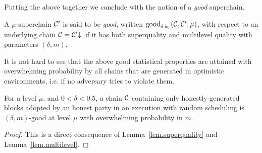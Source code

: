 
Putting the above together we conclude with the notion of a {\em good} superchain. 

\begin{definition}\label{lem.good}
A $\mu$-superchain $\mathcal{C}'$ is said to be \textit{good}, written
$\textnormal{good}_{\delta, k_1}(\mathcal{C}, \mathcal{C}', \mu)$, with respect to an
underlying chain $\mathcal{C} = \mathcal{C}'\negthickspace\downarrow\,$ if it has both superquality and multilevel quality with parameters $(\delta, m)$.
\end{definition}

It is not hard to see that the above good statistical properties are attained with overwhelming probability
by all chains that are generated in optimistic environments, i.e. if no
adversary tries to violate them.

\begin{lemma}
\label{lem.superchain-distribution}
For a level $\mu$, and $0 < \delta < 0.5$, a chain
$\mathcal{C}$ containing only honestly-generated blocks adopted by an honest party in
an execution with random scheduling is $(\delta, m)$-good at level
$\mu$ with overwhelming probability in $m$.
\end{lemma}
\ifonecolumn
\begin{proof}
This is a direct consequence of Lemma~\ref{lem.superquality} and
Lemma~\ref{lem.multilevel}. \Qed
\end{proof}
\fi
